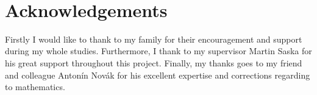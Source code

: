 ~\vfill{}

\section*{Acknowledgements}

Firstly I would like to thank to my family for their encouragement and support during my whole studies. Furthermore, I thank to my supervisor Martin Saska for his great support throughout this project. Finally, my thanks goes to my friend and colleague Antonín Novák for his excellent expertise and corrections regarding to mathematics.

\vspace{2.5cm}

\newpage{}
